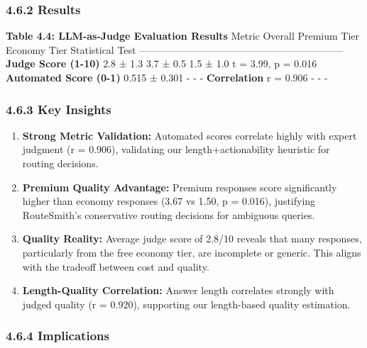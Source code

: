 \documentclass[
]{article}
\begin{document}
\hypertarget{results-2}{%
\subsubsection{4.6.2 Results}\label{results-2}}

\textbf{Table 4.4: LLM-as-Judge Evaluation Results} \textbar{} Metric
\textbar{} Overall \textbar{} Premium Tier \textbar{} Economy Tier
\textbar{} Statistical Test \textbar{}
\textbar--------\textbar---------\textbar--------------\textbar--------------\textbar------------------\textbar{}
\textbar{} \textbf{Judge Score (1-10)} \textbar{} 2.8 ± 1.3 \textbar{}
3.7 ± 0.5 \textbar{} 1.5 ± 1.0 \textbar{} t = 3.99, p = 0.016 \textbar{}
\textbar{} \textbf{Automated Score (0-1)} \textbar{} 0.515 ± 0.301
\textbar{} - \textbar{} - \textbar{} - \textbar{} \textbar{}
\textbf{Correlation} \textbar{} r = 0.906 \textbar{} - \textbar{} -
\textbar{} - \textbar{}

\hypertarget{key-insights}{%
\subsubsection{4.6.3 Key Insights}\label{key-insights}}

\begin{enumerate}
\def\labelenumi{\arabic{enumi}.}
\item
  \textbf{Strong Metric Validation:} Automated scores correlate highly
  with expert judgment (r = 0.906), validating our length+actionability
  heuristic for routing decisions.
\item
  \textbf{Premium Quality Advantage:} Premium responses score
  significantly higher than economy responses (3.67 vs 1.50, p = 0.016),
  justifying RouteSmith's conservative routing decisions for ambiguous
  queries.
\item
  \textbf{Quality Reality:} Average judge score of 2.8/10 reveals that
  many responses, particularly from the free economy tier, are
  incomplete or generic. This aligns with the tradeoff between cost and
  quality.
\item
  \textbf{Length-Quality Correlation:} Answer length correlates strongly
  with judged quality (r = 0.920), supporting our length-based quality
  estimation.
\end{enumerate}

\hypertarget{implications}{%
\subsubsection{4.6.4 Implications}\label{implications}}
\end{document}
